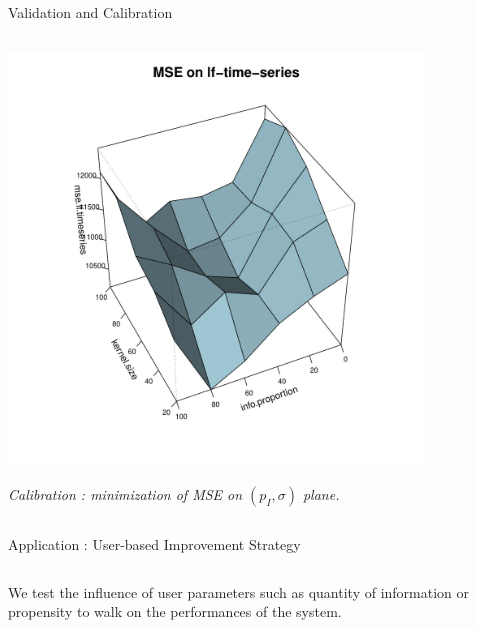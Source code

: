 \documentclass{beamer}
\begin{document}
\begin{frame}{}
\begin{columns}[t]
\begin{column}{.49\textwidth}
\begin{block}{Validation and Calibration}
\begin{columns}[t]
\begin{column}{.95\textwidth}
\begin{columns}[t]
\begin{column}{.47\textwidth}
           \includegraphics[width=0.9\columnwidth,height=11cm]{figures/calib3d}\\
             \begin{justify}
       \textit{\small Calibration : minimization of MSE on $(p_I,\sigma)$ plane.}
    \end{justify}
    
          \end{column}
          \end{columns}
          \end{column}
          \end{columns}
          
        \end{block}
  

    
   



  
      
        \begin{block}{Application : User-based Improvement Strategy}
          \begin{columns}[t]
        \begin{column}{.95\textwidth}
        \begin{justify}
        \vspace{-2cm}
            
          We test the influence of user parameters such as quantity of information or propensity to walk on the performances of the system.
          

\end{justify}
\end{column}
\end{columns}
\end{block}
\end{column}
\end{columns}
\end{frame}
\end{document}
